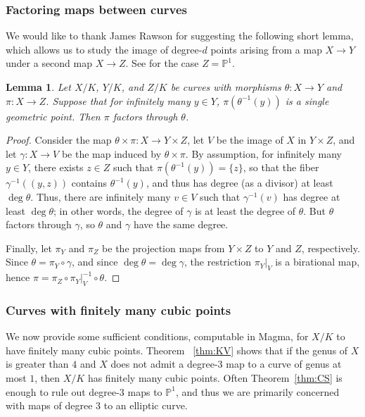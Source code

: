 \documentclass[12pt]{amsart}
\newtheorem{lem}[thm]{Lemma}
\theoremstyle{definition}
\numberwithin{equation}{section}
\begin{document}
\subsubsection{Factoring maps between curves}

We would like to thank James Rawson for suggesting the following short lemma, which allows us to study the image of degree-$d$ points arising from a map $X \to Y$ under a second map $X \to Z$. See  \cite{derickx/rawson:2025} for the case $Z = \mathbb{P}^1$.

\begin{lem}\label{lem:map must factor}
    Let $X/K$, $Y/K$, and $Z/K$ be curves with morphisms $\theta: X \to Y$ and $\pi: X \to Z$. Suppose that for infinitely many $y \in Y$, $\pi(\theta^{-1}(y))$ is a single geometric point. Then $\pi$ factors through $\theta$.
\end{lem}
\begin{proof}
    Consider the map $\theta \times \pi: X \to Y \times Z$, let $V$ be the image of $X$ in $Y \times Z$, and let $\gamma: X \to V$ be the map induced by $\theta \times \pi$.
    By assumption, for infinitely many $y \in Y$, there exists $z \in Z$ such that $\pi(\theta^{-1}(y)) = \{z\}$, so that the fiber $\gamma^{-1}((y , z))$ contains $\theta^{-1}(y)$,    
    and thus has degree (as a divisor) at least $\deg \theta$. Thus, there are infinitely many $v \in V$ such that $\gamma^{-1}(v)$ has degree at least $\deg \theta$; in other words, the degree of $\gamma$ is at least the degree of $\theta$. But $\theta$ factors through $\gamma$, so $\theta$ and $\gamma$ have the same degree.
    
    Finally, let $\pi_Y$ and $\pi_Z$ be the projection maps from $Y \times Z$ to $Y$ and $Z$, respectively. Since $\theta = \pi_Y \circ \gamma$, and since $\deg\theta = \deg\gamma$, the restriction $\pi_Y|_V$ is a birational map, hence $\pi = \pi_Z \circ \pi_Y|_V^{-1} \circ\theta$.
\end{proof}

\subsubsection{Curves with finitely many cubic points}

We now provide some sufficient conditions, computable in Magma, for $X/K$ to have finitely many cubic points. Theorem ~\ref{thm:KV} shows that if the genus of $X$ is greater than $4$ and $X$ does not admit a degree-$3$ map to a curve of genus at most $1$, then $X/K$ has finitely many cubic points. Often Theorem~\ref{thm:CS} is enough to rule out degree-$3$ maps to $\mathbb{P}^1$, and thus we are primarily concerned with maps of degree $3$ to an elliptic curve.
\end{document}

